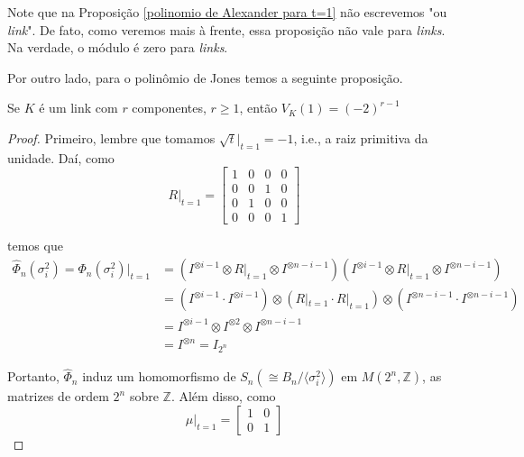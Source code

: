 	\par\vspace{0.3cm} Note que na Proposição \eqref{polinomio de Alexander para t=1} não escrevemos "ou \textit{link}". De fato, como veremos mais à frente, essa proposição não vale para \textit{links}. Na verdade, o módulo é zero para \textit{links}. 
	\par\vspace{0.3cm} Por outro lado, para o polinômio de Jones temos a seguinte proposição.
	\begin{prop}
		\label{polinomio de Jones para links}
		Se $K$ é um link com $r$ componentes, $r\geq 1$, então $V_K(1) = (-2)^{r-1}$
	\end{prop}
	\begin{proof}
		Primeiro, lembre que tomamos $\sqrt{t}|_{t=1} = -1$, i.e., a raiz primitiva da unidade. Daí, como
		\begin{equation*}
		R|_{t=1} = \begin{bmatrix}
		1 & 0 & 0 & 0 \\
		0 & 0 & 1 & 0 \\
		0 & 1 & 0 & 0 \\
		0 & 0 & 0 & 1
		\end{bmatrix}
		\end{equation*}
		\par\vspace{0.3cm} temos que
		\begin{align*}
		\widehat{\Phi}_n(\sigma_i^2) = \Phi_n(\sigma_i^2)|_{t=1} &= ( I^{\otimes i-1} \otimes R|_{t=1} \otimes I^{\otimes n-i-1} )( I^{\otimes i-1} \otimes R|_{t=1} \otimes I^{\otimes n-i-1} ) \\
		&= ( I^{\otimes i-1}\cdot I^{\otimes i-1} )\otimes( R|_{t=1}\cdot R|_{t=1} )\otimes( I^{\otimes n-i-1}\cdot I^{\otimes n-i-1} ) \\
		&= I^{\otimes i-1}\otimes I^{\otimes 2}\otimes I^{\otimes n-i-1} \\
		&= I^{\otimes n} = I_{2^n}
		\end{align*}
		\par\vspace{0.3cm} Portanto, $\widehat{\Phi}_n$ induz um homomorfismo de $S_n ( \cong B_n/\langle \sigma_i^2 \rangle )$ em $M(2^n, \mathbb{Z})$, as matrizes de ordem $2^n$ sobre $\mathbb{Z}$. Além disso, como
		\begin{equation*}
		\mu|_{t=1} = \begin{bmatrix}
		1 & 0 \\
		0 & 1
		\end{bmatrix}

\end{equation*}
\end{proof}
